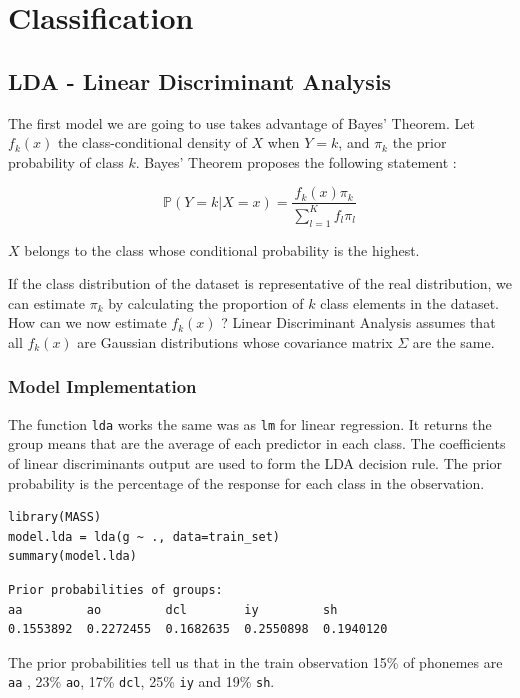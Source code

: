 \documentclass[]{report}
\begin{document}
\section{Classification}

\subsection{LDA - Linear Discriminant Analysis}
The first model we are going to use takes advantage of Bayes' Theorem. Let $f_k(x)$ the class-conditional density of $X$ when $Y=k$, and $\pi_k$ the prior probability of class $k$. Bayes' Theorem proposes the following statement : 

$$
\mathbb{P}(Y = k | X = x) = \frac{f_k(x)\pi_k}{\sum_{l = 1}^{K}f_l\pi_l} 
$$

$X$ belongs to the class whose conditional probability is the highest.

If the class distribution of the dataset is representative of the real distribution, we can estimate $\pi_k$ by calculating the proportion of $k$ class elements in the dataset. How can we now estimate $f_k(x)$ ? Linear Discriminant Analysis assumes that all $f_k(x)$ are Gaussian distributions whose covariance matrix $\Sigma$ are the same.

\subsubsection{Model Implementation}
The function \texttt{lda} works the same was as \texttt{lm} for linear regression. It returns the group means that are the average of each predictor in each class. The coefficients of linear discriminants output are used to form the LDA decision rule. The prior probability is the percentage of the response for each class in the observation.

\begin{lstlisting}
library(MASS)
model.lda = lda(g ~ ., data=train_set)
summary(model.lda)
\end{lstlisting}

\begin{verbatim}
Prior probabilities of groups:
aa         ao         dcl        iy         sh 
0.1553892  0.2272455  0.1682635  0.2550898  0.1940120 
\end{verbatim}

The prior probabilities tell us that in the train observation 15\% of phonemes are \texttt{aa} , 23\% \texttt{ao}, 17\% \texttt{dcl}, 25\% \texttt{iy} and 19\% \texttt{sh}.
\end{document}
